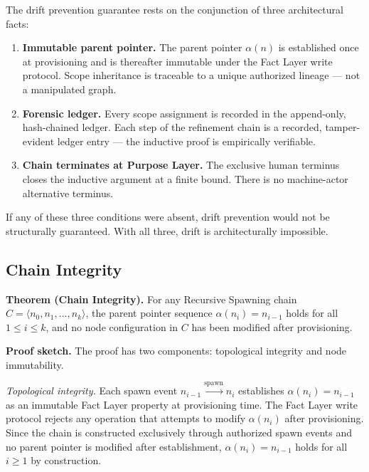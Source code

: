 \medskip
The drift prevention guarantee rests on the conjunction of three architectural facts:

\begin{enumerate}
    \item[(1)] \textbf{Immutable parent pointer.} The parent pointer $\alpha(n)$ is established once at provisioning and is thereafter immutable under the Fact Layer write protocol. Scope inheritance is traceable to a unique authorized lineage — not a manipulated graph.
    \item[(2)] \textbf{Forensic ledger.} Every scope assignment is recorded in the append-only, hash-chained ledger. Each step of the refinement chain is a recorded, tamper-evident ledger entry — the inductive proof is empirically verifiable.
    \item[(3)] \textbf{Chain terminates at Purpose Layer.} The exclusive human terminus closes the inductive argument at a finite bound. There is no machine-actor alternative terminus.
\end{enumerate}

If any of these three conditions were absent, drift prevention would not be structurally guaranteed. With all three, drift is architecturally impossible.

\subsection{Chain Integrity}
\label{sec:rs-chain-integrity}

\noindent\textbf{Theorem (Chain Integrity).} For any Recursive Spawning chain $C = \langle n_0, n_1, \ldots, n_k \rangle$, the parent pointer sequence $\alpha(n_i) = n_{i-1}$ holds for all $1 \leq i \leq k$, and no node configuration in $C$ has been modified after provisioning.

\medskip
\noindent\textbf{Proof sketch.} The proof has two components: topological integrity and node immutability.

\medskip
\textit{Topological integrity.} Each spawn event $n_{i-1} \xrightarrow{\mathrm{spawn}} n_i$ establishes $\alpha(n_i) = n_{i-1}$ as an immutable Fact Layer property at provisioning time. The Fact Layer write protocol rejects any operation that attempts to modify $\alpha(n_i)$ after provisioning. Since the chain is constructed exclusively through authorized spawn events and no parent pointer is modified after establishment, $\alpha(n_i) = n_{i-1}$ holds for all $i \geq 1$ by construction.

